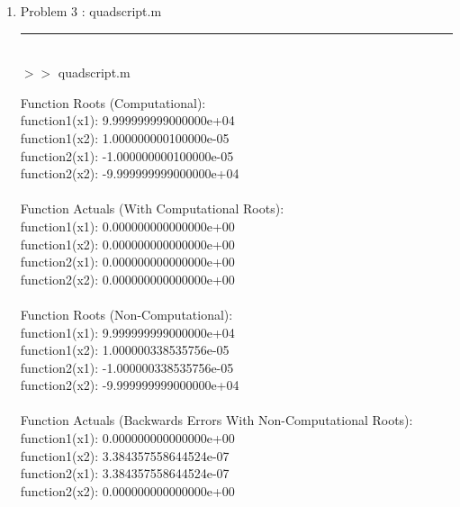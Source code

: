 \documentclass[12pt]{article}
\begin{document}
\begin{enumerate}
		\item[] Problem 3 : quadscript.m \noindent\rule{\textwidth}{1.0pt} \\
		
		
	$>>$ quadscript.m
	\begin{framed}
		Function Roots (Computational):\\
function1(x1): 9.999999999000000e+04\\
function1(x2): 1.000000000100000e-05\\
function2(x1): -1.000000000100000e-05\\
function2(x2): -9.999999999000000e+04\\
\\
Function Actuals (With Computational Roots):\\
function1(x1): 0.000000000000000e+00\\
function1(x2): 0.000000000000000e+00\\
function2(x1): 0.000000000000000e+00\\
function2(x2): 0.000000000000000e+00\\
\\
Function Roots (Non-Computational):\\
function1(x1): 9.999999999000000e+04\\
function1(x2): 1.000000338535756e-05\\
function2(x1): -1.000000338535756e-05\\
function2(x2): -9.999999999000000e+04\\
\\
Function Actuals (Backwards Errors With Non-Computational Roots):\\
function1(x1): 0.000000000000000e+00\\
function1(x2): 3.384357558644524e-07\\
function2(x1): 3.384357558644524e-07\\
function2(x2): 0.000000000000000e+00\\
	\end{framed}	
	
	\end{enumerate}
\end{document}

